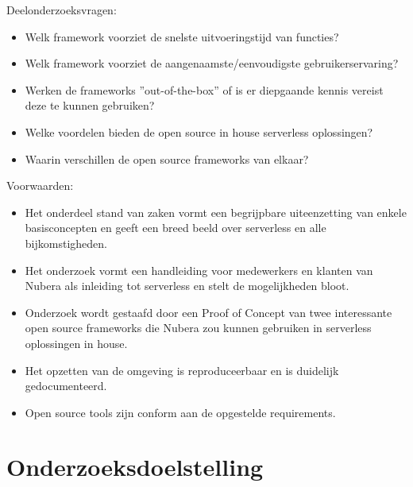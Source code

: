 Deelonderzoeksvragen: 
\begin{itemize}
    \item Welk framework voorziet de snelste uitvoeringstijd van functies?
    \item Welk framework voorziet de aangenaamste/eenvoudigste gebruikerservaring?
    \item Werken de frameworks ''out-of-the-box'' of is er diepgaande kennis vereist deze te kunnen gebruiken?
    \item Welke voordelen bieden de open source in house serverless oplossingen?
    \item Waarin verschillen de open source frameworks van elkaar?
\end{itemize}

Voorwaarden: 
\begin{itemize}
    \item Het onderdeel stand van zaken vormt een begrijpbare uiteenzetting van enkele basisconcepten en geeft een breed beeld over serverless en alle bijkomstigheden.
    \item Het onderzoek vormt een handleiding voor medewerkers en klanten van Nubera als inleiding tot serverless en stelt de mogelijkheden bloot.
    \item Onderzoek wordt gestaafd door een Proof of Concept van twee interessante open source frameworks die Nubera zou kunnen gebruiken in serverless oplossingen in house.
    \item Het opzetten van de omgeving is reproduceerbaar en is duidelijk gedocumenteerd.
    \item Open source tools zijn conform aan de opgestelde requirements.
\end{itemize}



\section{Onderzoeksdoelstelling}
\label{sec:onderzoeksdoelstelling}

